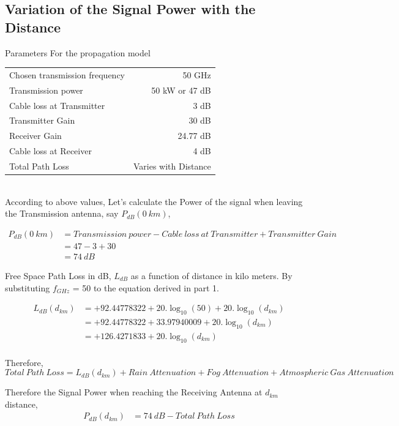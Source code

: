 \documentclass[a4paper,11pt]{article}%
\begin{document}
\pagebreak
\subsection{Variation of the Signal Power with the Distance}

Parameters For the propagation model\\

\begin{tabular}{l r}
Chosen transmission frequency & 50 GHz\\
Transmission power & 50 kW or 47 dB\\
Cable loss at Transmitter & 3 dB\\
Transmitter Gain & 30 dB\\
Receiver Gain &24.77 dB\\
Cable loss at Receiver &4 dB\\
Total Path Loss & Varies with Distance\\
\end{tabular}\\[1cm]

According to above values, Let's calculate the Power of the signal when leaving the  Transmission antenna, say $P_{dB}(0~km)$,

\[
\begin{split}
P_{dB}(0~km) & = Transmission~power -  Cable~loss~at~Transmitter + Transmitter~Gain\\
&=47-3+30\\
&=74~dB
\end{split}
\]

Free Space Path Loss in dB, $L_{dB}$ as a function of distance in kilo meters. By substituting $f_{GHz}$ = 50 to the equation derived in part 1.

\[
\begin{split}
L_{dB}(d_{km})&= +92.44778322+20.\log_{10}(50) + 20.\log_{10}(d_{km})\\
&=+92.44778322+ 33.97940009 + 20.\log_{10}(d_{km})\\
&=+126.4271833+ 20.\log_{10}(d_{km})\\
\end{split}
\]

Therefore, \[Total~Path~Loss = L_{dB}(d_{km}) + Rain~Attenuation+Fog~Attenuation+Atmospheric~Gas~Attenuation \]

Therefore the Signal Power when reaching the Receiving Antenna at $d_{km}$ distance,
\[
\begin{split}
P_{dB}(d_{km}) & =74~dB - Total~Path~Loss
\end{split}
\]
\end{document}

